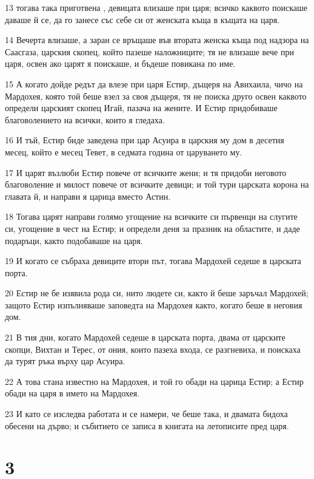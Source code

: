 \par 13 тогава така приготвена , девицата влизаше при царя; всичко каквото поискаше даваше й се, да го занесе със себе си от женската къща в къщата на царя.
\par 14 Вечерта влизаше, а заран се връщаше във втората женска къща под надзора на Саасгаза, царския скопец, който пазеше наложниците; тя не влизаше вече при царя, освен ако царят я поискаше, и бъдеше повикана по име.
\par 15 А когато дойде редът да влезе при царя Естир, дъщеря на Авихаила, чичо на Мардохея, която той беше взел за своя дъщеря, тя не поиска друго освен каквото определи царският скопец Игай, пазача на жените. И Естир придобиваше благоволението на всички, които я гледаха.
\par 16 И тъй, Естир биде заведена при цар Асуира в царския му дом в десетия месец, който е месец Тевет, в седмата година от царуването му.
\par 17 И царят възлюби Естир повече от всичките жени; и тя придоби неговото благоволение и милост повече от всичките девици; и той тури царската корона на главата й, и направи я царица вместо Астин.
\par 18 Тогава царят направи голямо угощение на всичките си първенци на слугите си, угощение в чест на Естир; и определи деня за празник на областите, и даде подаръци, както подобаваше на царя.
\par 19 И когато се събраха девиците втори път, тогава Мардохей седеше в царската порта.
\par 20 Естир не бе изявила рода си, нито людете си, както й беше заръчал Мардохей; защото Естир изпълняваше заповедта на Мардохея както, когато беше в неговия дом.
\par 21 В тия дни, когато Мардохей седеше в царската порта, двама от царските скопци, Вихтан и Терес, от ония, които пазеха входа, се разгневиха, и поискаха да турят ръка върху цар Асуира.
\par 22 А това стана известно на Мардохея, и той го обади на царица Естир; а Естир обади на царя в името на Мардохея.
\par 23 И като се изследва работата и се намери, че беше така, и двамата бидоха обесени на дърво; и събитието се записа в книгата на летописите пред царя.

\chapter{3}

